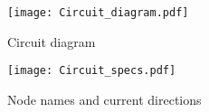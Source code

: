 \begin{figure}[h]
	\centering
	\texttt{[image: Circuit\_diagram.pdf]}
	\caption{Circuit diagram}
	\label{fig:circuit}
\end{figure}

\begin{figure}[h]
	\centering
	\texttt{[image: Circuit\_specs.pdf]}
	\caption{Node names and current directions}
	\label{fig:circuit_spec}
\end{figure}

\pagebreak
